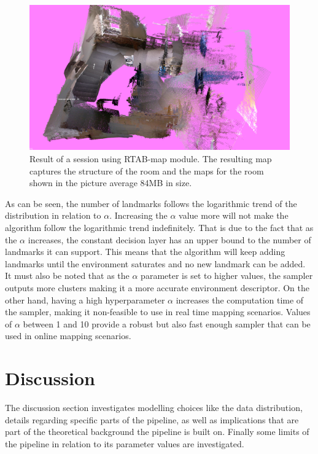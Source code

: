 \documentclass [twoside,hidelinks]{article}
\begin{document}
\begin{figure} [ht!]
  \centering
    \includegraphics [width=.8\textwidth]{rtabmap}
    \caption{Result of a session using RTAB-map module. The resulting map captures the structure of the room and the maps for the room shown in the picture average 84MB in size.}
  \label{rtabmap}
\end{figure}

As can be seen, the number of landmarks follows the logarithmic trend of the distribution in relation to $\alpha$.
Increasing the $\alpha$ value more will not make the algorithm follow the logarithmic trend indefinitely. 
That is due to the fact that as the $\alpha$ increases, the constant decision layer has an upper bound to the number of landmarks it can support. 
This means that the algorithm will keep adding landmarks until the environment saturates and no new landmark can be added.
It must also be noted that as the $\alpha$ parameter is set to higher values, the sampler outputs more clusters making it a more accurate environment descriptor.
On the other hand, having a high hyperparameter $\alpha$ increases the computation time of the sampler, making it non-feasible to use in real time mapping scenarios.
Values of $\alpha$ between 1 and 10 provide a robust but also fast enough sampler that can be used in online mapping scenarios.


\newpage
\section{Discussion}
\label{sec:discussion}

The discussion section investigates modelling choices like the data distribution, details regarding specific parts of the pipeline, as well as implications that are part of the theoretical background the pipeline is built on. Finally some limits of the pipeline in relation to its parameter values are investigated.
\end{document}
